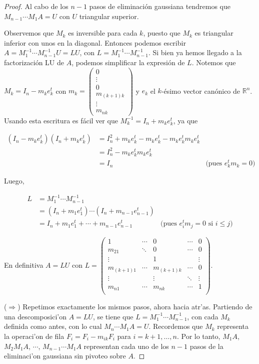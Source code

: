 \begin{propo}
\begin{proof}
Al cabo de los $n - 1$ pasos de eliminación gaussiana tendremos que $M_{n - 1} \cdots M_1 A = U$ con $U$ triangular superior. 

Observemos que $M_k$ es inversible para cada $k$, puesto que $M_k$ es triangular inferior con unos en la diagonal. Entonces podemos escribir $A = M_1^{-1}\cdots M_{n - 1}^{-1} U = LU$, con $L = M_1^{-1}\cdots M_{n - 1}^{-1}$. Si bien ya hemos llegado a la factorización LU de $A$, podemos simplificar la expresión de $L$. Notemos que $M_k = I_n - m_k e_k^t$ con $m_k = \begin{pmatrix}0\\ \vdots \\ 0 \\ m_{(k+1)k} \\ \vdots \\ m_{nk}\end{pmatrix}$ y $e_k$ el $k$-ésimo vector canónico de $\mathbb{R}^n$. Usando esta escritura es fácil ver que $M_k^{-1} = I_n + m_k e_k^t$, ya que

\begin{align*}
(I_n - m_k e_k^t)(I_n + m_k e_k^t) & = I_n^2 + m_k e_k^t - m_k e_k^t - m_k e_k^t m_k e_k^t &\\
& = I_n^2 - m_k e_k^t m_k e_k^t &\\
& = I_n & \text{(pues } e_k^t m_k = 0\text{)}
\end{align*}

Luego,

\begin{align*}
L & = M_1^{-1} \cdots M_{n - 1}^{-1} &\\
	& = (I_n + m_1 e_1^t) \cdots (I_n + m_{n - 1} e_{n - 1}^t) &\\
	& = I_n + m_1 e_1^t + \cdots + m_{n - 1} e_{n - 1}^t & \text{(pues } e_i^t m_j = 0 \text{ si } i \leq j \text{)}
\end{align*}

En definitiva $A = LU$ con $L = \begin{pmatrix} 
1 			& \cdots 	& 0 				& \cdots 	& 0 \\
m_{21} 		& \ddots 	& 0 				& \cdots 	& 0 \\
\vdots 		& 			& 1 				& 			& \vdots\\
m_{(k+1)1}	& \cdots		& m_{(k+1)k} 	& \cdots		& 0\\
\vdots		& 			& \vdots		 	& \ddots		& \vdots\\
m_{n1}		& \cdots		& m_{nk}		& \cdots		& 1\\
\end{pmatrix}$.

($\Rightarrow$) Repetimos exactamente los mismos pasos, ahora hacia atr'as. Partiendo de una descomposici'on $A = LU$, se tiene que $L = M_1^{-1}\cdots M_{n - 1}^{-1}$, con cada $M_k$ definida como antes, con lo cual $M_n \cdots M_1 A = U$. Recordemos que $M_k$ representa la operaci'on de fila $F_i = F_i - m_{ik}F_i$ para $i = k + 1, \dots, n$. Por lo tanto, $M_1A$, $M_2 M_1 A$, $\cdots$, $M_{n - 1} \cdots M_1 A$ representan cada uno de los $n - 1$ pasos de la eliminaci'on gaussiana sin pivoteo sobre $A$.

	\end{proof}
\end{propo}
